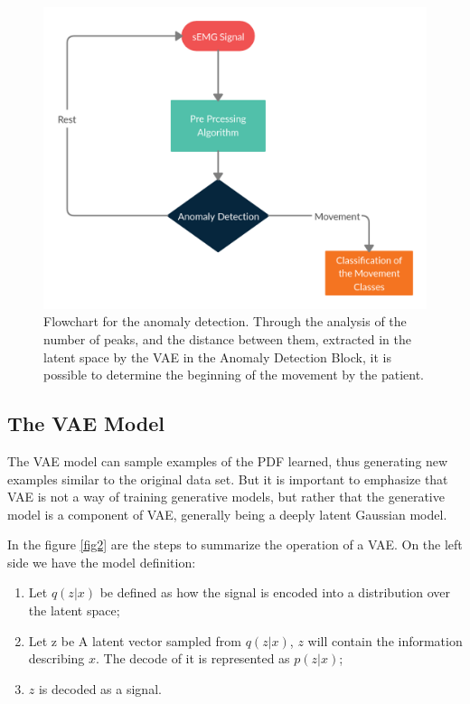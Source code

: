 \documentclass[nouppercase]{ifmbe}
\begin{document}
\begin{figure}[h]
\centering
\includegraphics[width=.8\linewidth]{figuras/anomaly_detection.png}
\caption{Flowchart for the anomaly detection. Through the analysis of the number of peaks,  and the distance between them, extracted in the latent space by the VAE in the Anomaly Detection Block, it is possible to determine the beginning of the movement by the patient.} \label{fig_flowchart}
\end{figure}

\subsection{The VAE Model}

The VAE model can sample examples of the PDF learned, thus generating new examples similar to the original data set. But it is important to emphasize that VAE is not a way of training generative models, but rather that the generative model is a component of VAE, generally being a deeply latent Gaussian model\cite{Rezende2014}.

In the figure \ref{fig2} are the steps to summarize the operation of a VAE. On the left side we have the model definition:

\begin{enumerate}
    \item  Let $q(z|x)$ be defined as how the signal is encoded into a distribution over the latent space;
    \item  Let z be A latent vector sampled from $ q(z|x)$, $z$ will contain the information describing $x$. The decode of it is represented as $p(z|x)$;
    \item  $z$ is decoded as a signal.
\end{enumerate}
\end{document}
